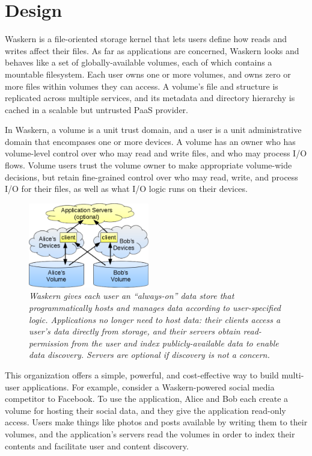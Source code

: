 \section{Design}
\label{sec:design}

Waskern is a file-oriented storage kernel that lets users define how reads and
writes affect their files.  As far as applications are concerned, Waskern looks
and behaves like a set of globally-available volumes, each of which contains a
mountable filesystem. Each user owns one or more volumes, and owns zero or more
files within volumes they can access.  A volume's file and structure is replicated across
multiple services, and its metadata and directory hierarchy is cached in a
scalable but untrusted PaaS provider.

In Waskern, a volume is a unit trust domain, and a user is a unit
administrative domain that encompases one or more devices.  A volume has an
owner who has volume-level control over who may read and write files, and who
may process I/O flows. Volume users trust the volume owner to make appropriate
volume-wide decisions, but retain fine-grained control over who may read, write,
and process I/O for their files, as well as what I/O logic runs on their
devices.

\begin{figure}[t!]
\centering
\includegraphics[width=0.47\textwidth]{figures/app-overview}
\caption{\it
Waskern gives each user an ``always-on'' data store that programmatically
hosts and manages data according to user-specified logic.  Applications no
longer need to host data:  their clients access a user's data directly from storage,
and their servers obtain read-permission from the user and
index publicly-available data to enable data discovery.  Servers are optional if
   discovery is not a concern.}
\label{fig:app-overview}
\end{figure}

This organization offers a simple, powerful, and cost-effective way to build multi-user
applications. For example, consider a Waskern-powered social media competitor
to Facebook. To use the application, Alice and Bob each create a volume for
hosting their social data, and they give the application read-only access. Users
make things like photos and posts available by writing them to their volumes,
and the application's servers read the volumes in order to index their
contents and facilitate user and content discovery.

